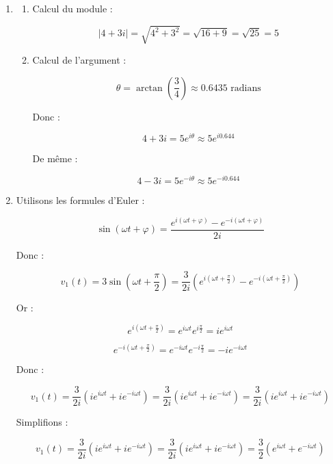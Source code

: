 \documentclass[a4paper,12pt]{article}
\begin{document}
\begin{solutionbox}
\begin{enumerate}
    \item 
    \begin{enumerate}
        \item Calcul du module :

        \[
        |4 + 3i| = \sqrt{4^2 + 3^2} = \sqrt{16 + 9} = \sqrt{25} = 5
        \]

        \item Calcul de l'argument :

        \[
        \theta = \arctan\left( \dfrac{3}{4} \right) \approx 0.6435 \text{ radians}
        \]

        Donc :

        \[
        4 + 3i = 5 e^{i \theta} \approx 5 e^{i 0.644}
        \]

        De même :

        \[
        4 - 3i = 5 e^{-i \theta} \approx 5 e^{-i 0.644}
        \]

    \end{enumerate}
    \item Utilisons les formules d'Euler :

    \[
    \sin(\omega t + \varphi) = \dfrac{e^{i(\omega t + \varphi)} - e^{-i(\omega t + \varphi)}}{2i}
    \]

    Donc :

    \[
    v_1(t) = 3 \sin\left( \omega t + \dfrac{\pi}{2} \right) = \dfrac{3}{2i} \left( e^{i\left( \omega t + \frac{\pi}{2} \right)} - e^{-i\left( \omega t + \frac{\pi}{2} \right)} \right)
    \]

    Or :

    \[
    e^{i\left( \omega t + \frac{\pi}{2} \right)} = e^{i\omega t} e^{i\frac{\pi}{2}} = i e^{i\omega t}
    \]

    \[
    e^{-i\left( \omega t + \frac{\pi}{2} \right)} = e^{-i\omega t} e^{-i\frac{\pi}{2}} = -i e^{-i\omega t}
    \]

    Donc :

    \[
    v_1(t) = \dfrac{3}{2i} \left( i e^{i\omega t} + i e^{-i\omega t} \right) = \dfrac{3}{2i} \left( i e^{i\omega t} + i e^{-i\omega t} \right) = \dfrac{3}{2i} \left( i e^{i\omega t} + i e^{-i\omega t} \right)
    \]

    Simplifions :

    \[
    v_1(t) = \dfrac{3}{2i} \left( i e^{i\omega t} + i e^{-i\omega t} \right) = \dfrac{3}{2i} \left( i e^{i\omega t} + i e^{-i\omega t} \right) = \dfrac{3}{2} \left( e^{i\omega t} + e^{-i\omega t} \right)
    \]


\end{enumerate}
\end{solutionbox}
\end{document}
